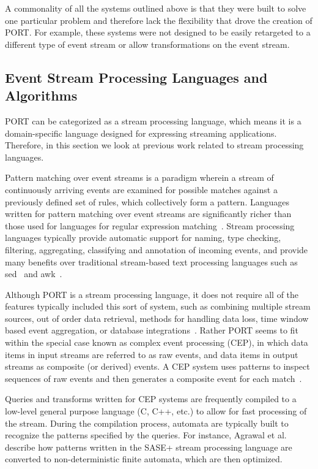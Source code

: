 A commonality
of all the systems
outlined above
is that they were built to solve one particular problem
and
therefore lack the flexibility that drove the creation of PORT.
For example, these systems were not designed to be easily retargeted
to a different type of event stream or allow transformations on the event stream.


\subsection{Event Stream Processing Languages and Algorithms}
PORT can be categorized as a stream processing language,
which means it is a domain-specific language
designed for expressing streaming applications.
Therefore,
in this section we look at previous work related to stream processing languages.

Pattern matching
over event streams is a paradigm
wherein a stream of continuously arriving events are examined for
possible matches against a previously defined set of rules,
which collectively form a pattern.
Languages written for pattern matching over event
streams are significantly richer than those used for
languages for regular expression
matching~\cite{DBLP:conf/sigmod/AgrawalDGI08}.
Stream processing languages typically provide automatic
support for naming, type checking, filtering, aggregating, classifying and
annotation of incoming events, and provide many benefits over traditional
stream-based text processing languages such as sed~\cite{Mcmahon1979sed} and
awk~\cite{DBLP:journals/spe/AhoKW79}.

Although PORT is a stream processing language, it does not
require all of the features typically
included this sort of system, such as
combining multiple stream sources,
out of order data retrieval,
methods for handling data loss,
time window based event aggregation,
or database integrations~\cite{DBLP:journals/csur/DayarathnaP18}.
Rather PORT seems to fit within the special case
known as complex event processing (CEP),
in which data items in input streams are referred to as raw events, and data items in output streams
as composite (or derived) events. A CEP system uses patterns to inspect
sequences of raw events and then generates a composite event for each
match~\cite{DBLP:journals/ibmrd/HirzelAGJKKMNSSW13}.

Queries and transforms written for CEP systems are
frequently compiled to a low-level general purpose language (C, C++, etc.) to allow for fast
processing of the stream. During the compilation process, automata are typically
built to recognize the patterns specified by the queries. For instance, Agrawal et
al.~\cite{DBLP:conf/sigmod/AgrawalDGI08} describe how patterns written in the SASE+ stream
processing language are converted to non-deterministic finite automata, which are then
optimized.

